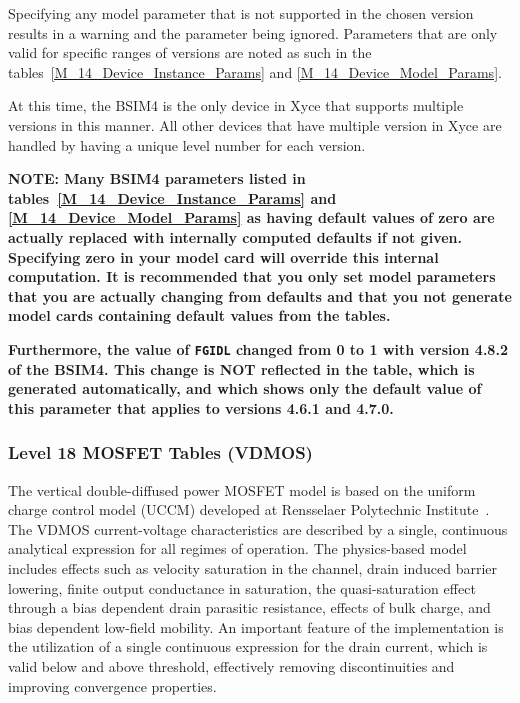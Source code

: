 Specifying any model parameter that is
not supported in the chosen version results in a warning and the
parameter being ignored.  Parameters that are only valid for specific
ranges of versions are noted as such in the
tables~\ref{M_14_Device_Instance_Params} and
\ref{M_14_Device_Model_Params}.

At this time, the BSIM4 is the only device in Xyce that supports
multiple versions in this manner.  All other devices that have
multiple version in Xyce are handled by having a unique level number
for each version.

\textbf{NOTE: Many BSIM4 parameters listed in
  tables~\ref{M_14_Device_Instance_Params} and
  \ref{M_14_Device_Model_Params} as having default values of zero are
  actually replaced with internally computed defaults if not given.
  Specifying zero in your model card will override this internal
  computation.  It is recommended that you only set model parameters
  that you are actually changing from defaults and that you not
  generate model cards containing default values from the tables.
}

\textbf{
  Furthermore, the value of \texttt{FGIDL} changed from 0 to 1 with
  version 4.8.2 of the BSIM4.  This change is NOT reflected in the
  table, which is generated automatically, and which shows only the
  default value of this parameter that applies to versions 4.6.1 and
  4.7.0.}





\clearpage
\subsubsection{Level 18 MOSFET Tables (VDMOS)}
The vertical double-diffused power MOSFET model is based on the uniform charge
control model (UCCM) developed at Rensselaer Polytechnic Institute~\cite{Fjeldly:1998}.
The VDMOS current-voltage characteristics are described by a single, continuous
analytical expression for all regimes of operation.  The physics-based model
includes effects such as velocity saturation in the channel, drain induced barrier
lowering, finite output conductance in saturation, the quasi-saturation effect
through a bias dependent drain parasitic resistance, effects of bulk charge, and
bias dependent low-field mobility.  An important feature of the implementation
is the utilization of a single continuous expression for the drain current, which
is valid below and above threshold, effectively removing discontinuities and
improving convergence properties.

